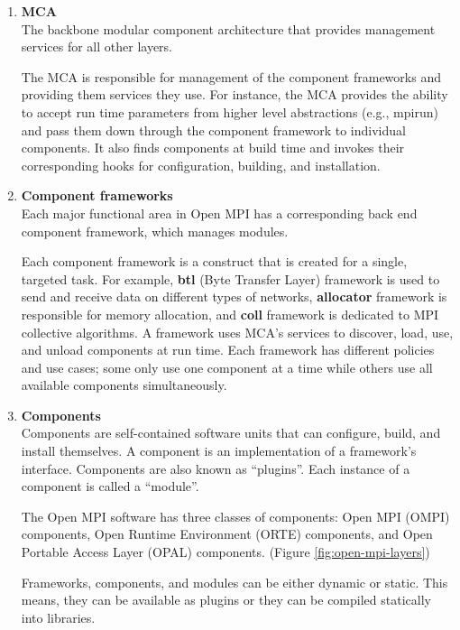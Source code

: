 \begin{enumerate}
\item \textbf {MCA}\\
  The backbone modular component architecture that provides management services for all other layers.
  
  The MCA is responsible for management of the component frameworks and providing them services they use. For instance, the MCA provides the ability to accept run time parameters from higher level abstractions (e.g., mpirun) and pass them down through the component framework to individual components. It also finds components at build time and invokes their corresponding hooks for configuration, building, and installation.
  
\item \textbf{Component frameworks}\\
  Each major functional area in Open MPI has a corresponding back end component framework, which manages modules.
  
  Each component framework is a construct that is created for a single, targeted task. For example, \textbf{btl} (Byte Transfer Layer) framework is used to send and receive data on different types of networks, \textbf{allocator} framework is responsible for memory allocation, and \textbf{coll} framework is dedicated to MPI collective algorithms. A framework uses MCA's services to discover, load, use, and unload components at run time. Each framework has different policies and use cases; some only use one component at a time while others use all available components simultaneously.

\item \textbf {Components}\\
  Components are self-contained software units that can configure, build, and install themselves. A component is an implementation of a framework's interface. Components are also known as ``plugins''. Each instance of a component is called a ``module''. 

  The Open MPI software has three classes of components: Open MPI (OMPI) components, Open Runtime Environment (ORTE) components, and Open Portable Access Layer (OPAL) components. (Figure \ref{fig:open-mpi-layers})

  Frameworks, components, and modules can be either dynamic or static. This means, they can be available as plugins or they can be compiled statically into libraries.
\end{enumerate}

